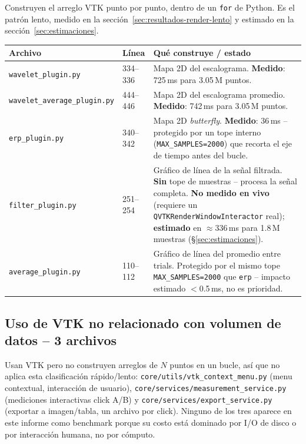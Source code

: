 \documentclass[11pt,a4paper]{article}
\begin{document}
Construyen el arreglo VTK punto por punto, dentro de un \texttt{for} de Python. Es el patrón lento, medido
en la sección~\ref{sec:resultados-render-lento} y estimado en la sección~\ref{sec:estimaciones}.

\begin{center}
\begin{longtable}{L{5.7cm}L{2.2cm}L{6.6cm}}
\toprule
\textbf{Archivo} & \textbf{Línea} & \textbf{Qué construye / estado} \\
\midrule
\endhead
\texttt{wavelet\_\allowbreak plugin.py} & 334--336 & Mapa 2D del escalograma. \textbf{Medido}: 725\,ms para 3.05\,M puntos. \\
\texttt{wavelet\_\allowbreak average\_\allowbreak plugin.py} & 444--446 & Mapa 2D del escalograma promedio. \textbf{Medido}: 742\,ms para 3.05\,M puntos. \\
\texttt{erp\_\allowbreak plugin.py} & 340--342 & Mapa 2D \textit{butterfly}. \textbf{Medido}: 36\,ms -- protegido por un tope interno (\texttt{MAX\_\allowbreak SAMPLES=2000}) que recorta el eje de tiempo antes del bucle. \\
\texttt{filter\_\allowbreak plugin.py} & 251--254 & Gráfico de línea de la señal filtrada. \textbf{Sin} tope de muestras -- procesa la señal completa. \textbf{No medido en vivo} (requiere un \texttt{QVTKRenderWindowInteractor} real); \textbf{estimado} en $\approx$336\,ms para 1.8\,M muestras (\S\ref{sec:estimaciones}). \\
\texttt{average\_\allowbreak plugin.py} & 110--112 & Gráfico de línea del promedio entre trials. Protegido por el mismo tope \texttt{MAX\_\allowbreak SAMPLES=2000} que \texttt{erp} -- impacto estimado $<$0.5\,ms, no es prioridad. \\
\bottomrule
\end{longtable}
\end{center}

\subsection{Uso de VTK no relacionado con volumen de datos -- 3 archivos}

Usan VTK pero no construyen arreglos de $N$ puntos en un bucle, así que no aplica esta clasificación
rápido/lento: \texttt{core/utils/vtk\_\allowbreak context\_\allowbreak menu.py} (menu contextual, interacción
de usuario), \texttt{core/services/measurement\_\allowbreak service.py} (mediciones interactivas click A/B) y
\texttt{core/services/export\_\allowbreak service.py} (exportar a imagen/tabla, un archivo por click). Ninguno
de los tres aparece en este informe como benchmark porque su costo está dominado por I/O de disco o por
interacción humana, no por cómputo.
\end{document}
